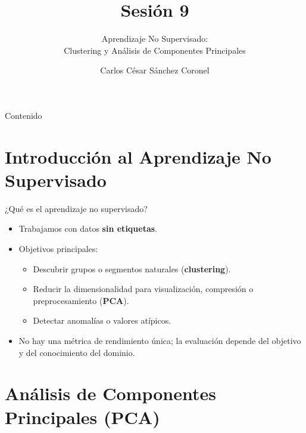 \documentclass[aspectratio=169, 10pt, xcolor=table]{beamer}
\title[SESIÓN 9]{\textbf{Sesión 9}}
\subtitle{Aprendizaje No Supervisado: \\ Clustering y Análisis de Componentes Principales}
\author[Prof. C. Sánchez]{Carlos César Sánchez Coronel}
\institute{\textbf{MACHINE LEARNING}}
\date{}
\begin{document}
\begin{frame}
    \titlepage
\end{frame}

\begin{frame}{Contenido}
    \tableofcontents
\end{frame}

\section{Introducción al Aprendizaje No Supervisado}

\begin{frame}{¿Qué es el aprendizaje no supervisado?}
    \begin{itemize}
        \item Trabajamos con datos \textbf{sin etiquetas}.
        \item Objetivos principales:
        \begin{itemize}
            \item Descubrir grupos o segmentos naturales (\textbf{clustering}).
            \item Reducir la dimensionalidad para visualización, compresión o preprocesamiento (\textbf{PCA}).
            \item Detectar anomalías o valores atípicos.
        \end{itemize}
        \item No hay una métrica de rendimiento única; la evaluación depende del objetivo y del conocimiento del dominio.
    \end{itemize}
\end{frame}

\section{Análisis de Componentes Principales (PCA)}
\end{document}

